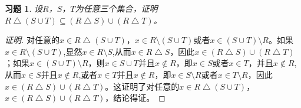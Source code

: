 \documentclass{article}
\begin{document}
\begin{CJK}{UTF8}{gbsn}
  \newtheorem*{Ex}{习题}
  \begin{Ex}
      设$R$，$S$，$T$为任意三个集合，证明$R\bigtriangleup (S\cup T) \subseteq  (R\bigtriangleup S)\cup (R\bigtriangleup T)$。
\end{Ex}
\begin{proof}[证明]
  对任意的$x\in R\bigtriangleup (S\cup T)$，$x\in R\setminus (S\cup T)$或者$x\in  (S\cup T)\setminus R$。如果$x\in R\setminus (S\cup T)$,显然$x\in R\setminus S$,从而$x\in R\bigtriangleup S$，因此$x\in (R\bigtriangleup S)\cup (R\bigtriangleup T)$；如果$x\in  (S\cup T)\setminus R$，则$x\in S\cup T$并且$x\notin R$，即$x\in S$或者$x\in T$，并且$x\notin R$,从而$x\in S$并且$x\notin R$,或者$x\in T$并且$x\notin R$，即$x\in S\setminus R$或者$x\in T\setminus R$，因此$x\in (R\bigtriangleup S)\cup (R\bigtriangleup T)$。这证明了对任意的$x\in R\bigtriangleup (S\cup T)$，$x\in (R\bigtriangleup S)\cup (R\bigtriangleup T)$，结论得证。
\end{proof}
\end{CJK}
\end{document}
